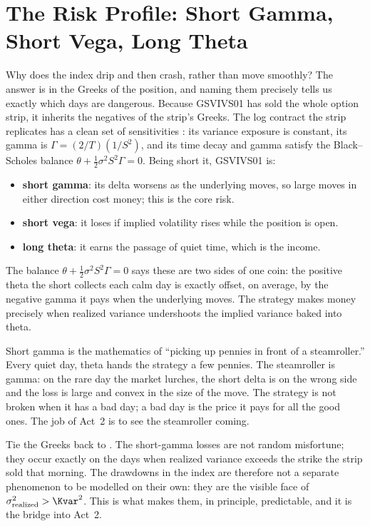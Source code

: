 \section{The Risk Profile: Short Gamma, Short Vega, Long Theta}
\label{sec:gsvivs:risk-profile}

Why does the index drip and then crash, rather than move smoothly? The answer is in the Greeks of the position, and naming them precisely tells us exactly which days are dangerous. Because GSVIVS01 has sold the whole option strip, it inherits the negatives of the strip's Greeks. The log contract the strip replicates has a clean set of sensitivities \citep[Eqs.~9--12, p.~12]{Demeterfi1999}: its variance exposure is constant, its gamma is $\Gamma = (2/T)(1/S^2)$, and its time decay and gamma satisfy the Black--Scholes balance $\theta + \tfrac12\sigma^2 S^2 \Gamma = 0$. Being short it, GSVIVS01 is:
\begin{itemize}
  \item \textbf{short gamma}: its delta worsens as the underlying moves, so large moves in either direction cost money; this is the core risk.
  \item \textbf{short vega}: it loses if implied volatility rises while the position is open.
  \item \textbf{long theta}: it earns the passage of quiet time, which is the income.
\end{itemize}
The balance $\theta + \tfrac12\sigma^2 S^2\Gamma = 0$ says these are two sides of one coin: the positive theta the short collects each calm day is exactly offset, on average, by the negative gamma it pays when the underlying moves. The strategy makes money precisely when realized variance undershoots the implied variance baked into theta.

\begin{intuition}
Short gamma is the mathematics of ``picking up pennies in front of a steamroller.'' Every quiet day, theta hands the strategy a few pennies. The steamroller is gamma: on the rare day the market lurches, the short delta is on the wrong side and the loss is large and convex in the size of the move. The strategy is not broken when it has a bad day; a bad day is the price it pays for all the good ones. The job of Act~2 is to see the steamroller coming.
\end{intuition}

\begin{keyidea}
Tie the Greeks back to . The short-gamma losses are not random misfortune; they occur exactly on the days when realized variance exceeds the strike the strip sold that morning. The drawdowns in the index are therefore not a separate phenomenon to be modelled on their own: they are the visible face of $\sigma^2_{\text{realized}} > \Kvar^2$. This is what makes them, in principle, predictable, and it is the bridge into Act~2.
\end{keyidea}

